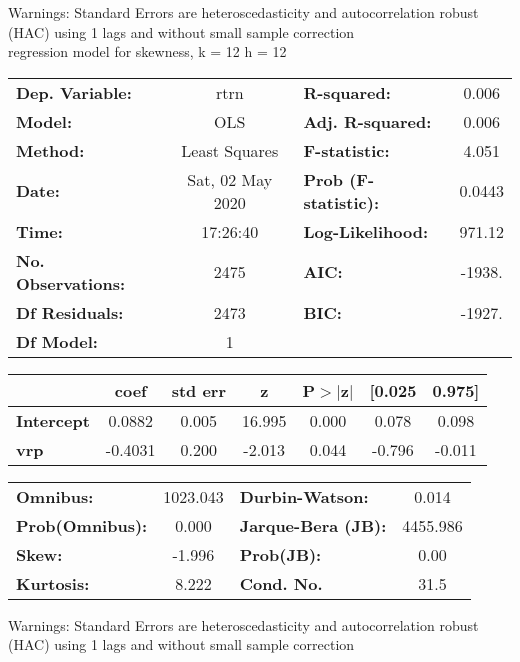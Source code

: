 Warnings: \newline
 [1] Standard Errors are heteroscedasticity and autocorrelation robust (HAC) using 1 lags and without small sample correction\\ 

regression model for skewness, k = 12 h = 12\begin{center}
\begin{tabular}{lclc}
\toprule
\textbf{Dep. Variable:}    &       rtrn       & \textbf{  R-squared:         } &     0.006   \\
\textbf{Model:}            &       OLS        & \textbf{  Adj. R-squared:    } &     0.006   \\
\textbf{Method:}           &  Least Squares   & \textbf{  F-statistic:       } &     4.051   \\
\textbf{Date:}             & Sat, 02 May 2020 & \textbf{  Prob (F-statistic):} &   0.0443    \\
\textbf{Time:}             &     17:26:40     & \textbf{  Log-Likelihood:    } &    971.12   \\
\textbf{No. Observations:} &        2475      & \textbf{  AIC:               } &    -1938.   \\
\textbf{Df Residuals:}     &        2473      & \textbf{  BIC:               } &    -1927.   \\
\textbf{Df Model:}         &           1      & \textbf{                     } &             \\
\bottomrule
\end{tabular}
\begin{tabular}{lcccccc}
                   & \textbf{coef} & \textbf{std err} & \textbf{z} & \textbf{P$> |$z$|$} & \textbf{[0.025} & \textbf{0.975]}  \\
\midrule
\textbf{Intercept} &       0.0882  &        0.005     &    16.995  &         0.000        &        0.078    &        0.098     \\
\textbf{vrp}       &      -0.4031  &        0.200     &    -2.013  &         0.044        &       -0.796    &       -0.011     \\
\bottomrule
\end{tabular}
\begin{tabular}{lclc}
\textbf{Omnibus:}       & 1023.043 & \textbf{  Durbin-Watson:     } &    0.014  \\
\textbf{Prob(Omnibus):} &   0.000  & \textbf{  Jarque-Bera (JB):  } & 4455.986  \\
\textbf{Skew:}          &  -1.996  & \textbf{  Prob(JB):          } &     0.00  \\
\textbf{Kurtosis:}      &   8.222  & \textbf{  Cond. No.          } &     31.5  \\
\bottomrule
\end{tabular}
\end{center}

Warnings: \newline
 [1] Standard Errors are heteroscedasticity and autocorrelation robust (HAC) using 1 lags and without small sample correction\\ 


